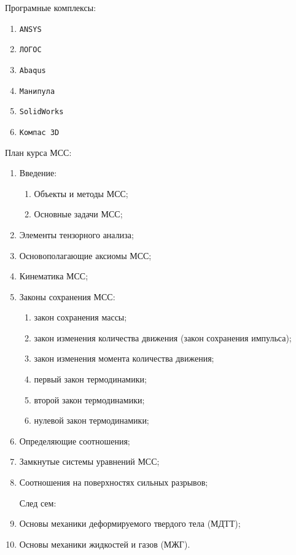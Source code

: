 
Програмные комплексы:

\begin{enumerate}
	\item \texttt{ANSYS}
	\item \texttt{ЛОГОС}
	\item \texttt{Abaqus}
	\item \texttt{Манипула}
	\item \texttt{SolidWorks}
	\item \texttt{Компас 3D}
\end{enumerate}

План курса МСС:
\begin{enumerate}
  \item Введение:
    \begin{enumerate}
      \item Объекты и методы МСС;
      \item Основные задачи МСС;
    \end{enumerate}

  \item Элементы тензорного анализа;
  \item Основополагающие аксиомы МСС;
  \item Кинематика МСС;
  \item Законы сохранения МСС:
    \begin{enumerate}
      \item закон сохранения массы;
      \item закон изменения количества движения (закон сохранения импульса);
      \item закон изменения момента количества движения;
      \item первый закон термодинамики;
      \item второй закон термодинамики;
      \item нулевой закон термодинамики;
    \end{enumerate}
  \item Определяющие соотношения;
  \item Замкнутые системы уравнений МСС;
  \item Соотношения на поверхностях сильных разрывов;

    След сем:
  \item Основы механики деформируемого твердого тела (МДТТ);
  \item Основы механики жидкостей и газов (МЖГ).
\end{enumerate}

